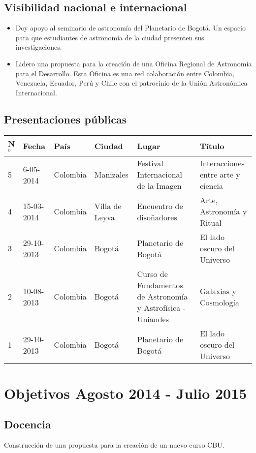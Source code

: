 \documentclass{article}
\begin{document}
\subsection{Visibilidad nacional e internacional}
\begin{itemize}
\item {Doy apoyo al seminario de astronom\'ia del Planetario de
  Bogot\'a. Un espacio para que estudiantes de astronom\'ia de la
  ciudad presenten sus investigaciones.}  
\item {Lidero una propuesta para la creaci\'on de una Oficina Regional
  de Astronom\'ia para el Desarrollo. Esta Oficina es una red
  colaboraci\'on entre Colombia, Venezuela, Ecuador, Per\'u y Chile
  con el patrocinio de la Uni\'on Astron\'omica Internacional.}  
\end{itemize}

\subsection{Presentaciones p\'ublicas}

\begin{tabular}{l l l l p{3cm} p{4cm}}\hline
N$^{o}$ & Fecha & Pa\'is & Ciudad & Lugar & T\'itulo\\\hline
5 & 6-05-2014 & Colombia & Manizales & Festival Internacional de la
Imagen & Interacciones entre arte y ciencia\\ \hline
4 & 15-03-2014  & Colombia & Villa de Leyva & Encuentro de
diso\~nadores & Arte, Astronomía y Ritual \\ \hline
3 & 29-10-2013 & Colombia & Bogot\'a & Planetario de Bogot\'a & El
lado oscuro del Universo\\ \hline 
2 & 10-08-2013 & Colombia & Bogot\'a & Curso de Fundamentos de
Astronom\'ia y Astrof\'isica - Uniandes & Galaxias y
Cosmolog\'ia\\    \hline
1 & 29-10-2013 & Colombia & Bogot\'a & Planetario de Bogot\'a & El
lado oscuro del Universo\\ \hline 
\end{tabular}



\section{Objetivos Agosto 2014 - Julio 2015}


\subsection{Docencia}
Construcci\'on de una propuesta para la creaci\'on de un nuevo curso
CBU. 
\end{document}
